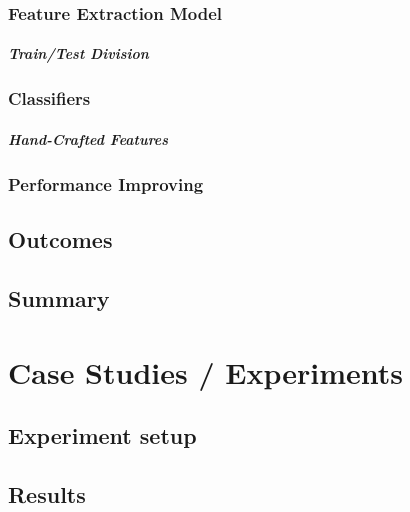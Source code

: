 \documentclass[
  twoside,
  11pt, a4paper,
  footinclude=true,
  headinclude=true,
  cleardoublepage=empty
]{scrbook}
\begin{document}
      \subsection{Feature Extraction Model}

        \paragraph{Train/Test Division}

      \subsection{Classifiers}

        \paragraph{Hand-Crafted Features}

      \subsection{Performance Improving} \label{development:implementation:performance}

    \section{Outcomes} \label{development:outcomes}

    \section{Summary} \label{development:summary}

  \chapter{Case Studies / Experiments} \label{experiments}

    \section{Experiment setup} \label{experiments:tests}

    \section{Results} \label{experiments:results}
\end{document}
